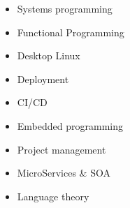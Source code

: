 \documentclass[a4paper]{report}
\begin{document}
\begin{multicols}{3}
    \centering
    \begin{itemize}[leftmargin=2em, topsep=-.5em, parsep=0em]
        \item Systems programming
        \item Functional Programming
        \item Desktop Linux
        \item Deployment
        \item CI/CD
        \item Embedded programming
        \item Project management
        \item MicroServices \& SOA
        \item Language theory
    \end{itemize}
\end{multicols}

\newcommand{\p}[1]{\textbf{#1}\mbox{}\newline}
\def\n{\\}
\end{document}
